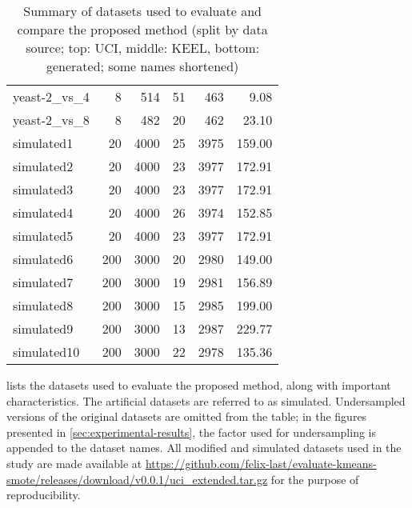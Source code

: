\documentclass[sort&compress]{elsarticle}
\begin{document}
\begin{table}[!htb]
\begin{tabular}{lrrrrr}
				yeast-2\_vs\_4 &              8 &             514 &                       51 &                      463 &             9.08 \\
				yeast-2\_vs\_8 &              8 &             482 &                       20 &                      462 &            23.10 \\
			\midrule
				simulated1 &             20 &            4000 &                       25 &                     3975 &           159.00 \\
				simulated2 &             20 &            4000 &                       23 &                     3977 &           172.91 \\
				simulated3 &             20 &            4000 &                       23 &                     3977 &           172.91 \\
				simulated4 &             20 &            4000 &                       26 &                     3974 &           152.85 \\
				simulated5 &             20 &            4000 &                       23 &                     3977 &           172.91 \\
				simulated6 &            200 &            3000 &                       20 &                     2980 &           149.00 \\
				simulated7 &            200 &            3000 &                       19 &                     2981 &           156.89 \\
				simulated8 &            200 &            3000 &                       15 &                     2985 &           199.00 \\
				simulated9 &            200 &            3000 &                       13 &                     2987 &           229.77 \\
				simulated10 &            200 &            3000 &                       22 &                     2978 &           135.36 \\
			\bottomrule
			\end{tabular}
		\caption{Summary of datasets used to evaluate and compare the proposed method (split by data source; top: UCI, middle: KEEL, bottom: generated; some names shortened)}
		\label{tab:datasets}
	\end{table}
	
	 lists the datasets used to evaluate the proposed method, along with important characteristics. The artificial datasets are referred to as simulated. Undersampled versions of the original datasets are omitted from the table; in the figures presented in \cref{sec:experimental-results}, the factor used for undersampling is appended to the dataset names. All modified and simulated datasets used in the study are made available at \url{https://github.com/felix-last/evaluate-kmeans-smote/releases/download/v0.0.1/uci_extended.tar.gz} for the purpose of reproducibility.
\end{document}
